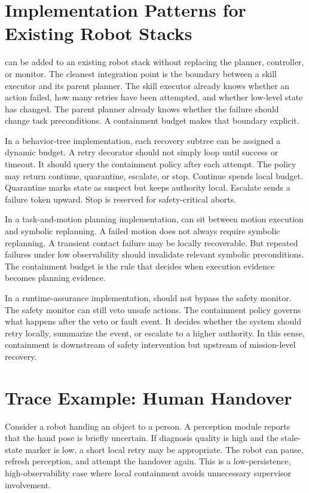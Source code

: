 \section{Implementation Patterns for Existing Robot Stacks}

\method can be added to an existing robot stack without replacing the planner, controller, or monitor. The cleanest integration point is the boundary between a skill executor and its parent planner. The skill executor already knows whether an action failed, how many retries have been attempted, and whether low-level state has changed. The parent planner already knows whether the failure should change task preconditions. A containment budget makes that boundary explicit.

In a behavior-tree implementation, each recovery subtree can be assigned a dynamic budget. A retry decorator should not simply loop until success or timeout. It should query the containment policy after each attempt. The policy may return continue, quarantine, escalate, or stop. Continue spends local budget. Quarantine marks state as suspect but keeps authority local. Escalate sends a failure token upward. Stop is reserved for safety-critical aborts.

In a task-and-motion planning implementation, \method can sit between motion execution and symbolic replanning. A failed motion does not always require symbolic replanning. A transient contact failure may be locally recoverable. But repeated failures under low observability should invalidate relevant symbolic preconditions. The containment budget is the rule that decides when execution evidence becomes planning evidence.

In a runtime-assurance implementation, \method should not bypass the safety monitor. The safety monitor can still veto unsafe actions. The containment policy governs what happens after the veto or fault event. It decides whether the system should retry locally, summarize the event, or escalate to a higher authority. In this sense, containment is downstream of safety intervention but upstream of mission-level recovery.

\section{Trace Example: Human Handover}

Consider a robot handing an object to a person. A perception module reports that the hand pose is briefly uncertain. If diagnosis quality is high and the stale-state marker is low, a short local retry may be appropriate. The robot can pause, refresh perception, and attempt the handover again. This is a low-persistence, high-observability case where local containment avoids unnecessary supervisor involvement.

